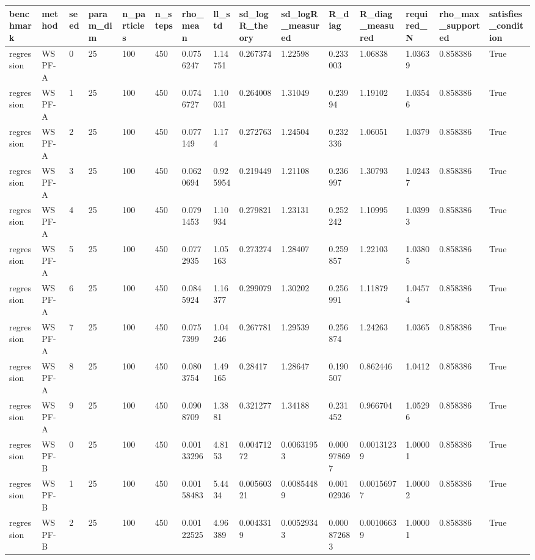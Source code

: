 \begin{tabular}{lllllllllllllll}
\hline
benchmark & method & seed & param\_dim & n\_particles & n\_steps & rho\_mean & ll\_std & sd\_logR\_theory & sd\_logR\_measured & R\_diag & R\_diag\_measured & required\_N & rho\_max\_supported & satisfies\_condition \\
\hline
regression & WSPF-A & 0 & 25 & 100 & 450 & 0.0756247 & 1.14751 & 0.267374 & 1.22598 & 0.233003 & 1.06838 & 1.03639 & 0.858386 & True \\
regression & WSPF-A & 1 & 25 & 100 & 450 & 0.0746727 & 1.10031 & 0.264008 & 1.31049 & 0.23994 & 1.19102 & 1.03546 & 0.858386 & True \\
regression & WSPF-A & 2 & 25 & 100 & 450 & 0.077149 & 1.174 & 0.272763 & 1.24504 & 0.232336 & 1.06051 & 1.0379 & 0.858386 & True \\
regression & WSPF-A & 3 & 25 & 100 & 450 & 0.0620694 & 0.925954 & 0.219449 & 1.21108 & 0.236997 & 1.30793 & 1.02437 & 0.858386 & True \\
regression & WSPF-A & 4 & 25 & 100 & 450 & 0.0791453 & 1.10934 & 0.279821 & 1.23131 & 0.252242 & 1.10995 & 1.03993 & 0.858386 & True \\
regression & WSPF-A & 5 & 25 & 100 & 450 & 0.0772935 & 1.05163 & 0.273274 & 1.28407 & 0.259857 & 1.22103 & 1.03805 & 0.858386 & True \\
regression & WSPF-A & 6 & 25 & 100 & 450 & 0.0845924 & 1.16377 & 0.299079 & 1.30202 & 0.256991 & 1.11879 & 1.04574 & 0.858386 & True \\
regression & WSPF-A & 7 & 25 & 100 & 450 & 0.0757399 & 1.04246 & 0.267781 & 1.29539 & 0.256874 & 1.24263 & 1.0365 & 0.858386 & True \\
regression & WSPF-A & 8 & 25 & 100 & 450 & 0.0803754 & 1.49165 & 0.28417 & 1.28647 & 0.190507 & 0.862446 & 1.0412 & 0.858386 & True \\
regression & WSPF-A & 9 & 25 & 100 & 450 & 0.0908709 & 1.3881 & 0.321277 & 1.34188 & 0.231452 & 0.966704 & 1.05296 & 0.858386 & True \\
regression & WSPF-B & 0 & 25 & 100 & 450 & 0.00133296 & 4.8153 & 0.00471272 & 0.00631953 & 0.000978697 & 0.00131239 & 1.00001 & 0.858386 & True \\
regression & WSPF-B & 1 & 25 & 100 & 450 & 0.00158483 & 5.4434 & 0.00560321 & 0.00854489 & 0.00102936 & 0.00156977 & 1.00002 & 0.858386 & True \\
regression & WSPF-B & 2 & 25 & 100 & 450 & 0.00122525 & 4.96389 & 0.0043319 & 0.00529343 & 0.000872683 & 0.00106639 & 1.00001 & 0.858386 & True \\

\end{tabular}
